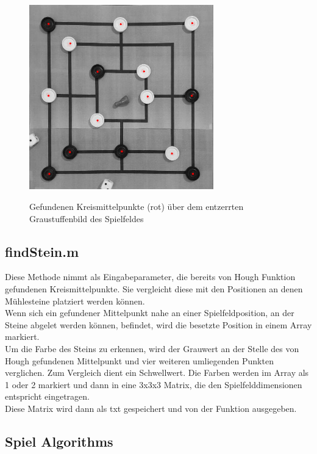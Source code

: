 \documentclass[paper=A4, deutsch]{scrartcl}
\begin{document}
\begin{figure}[ht]
	\centering
		\includegraphics[width=8cm]{hough_performance.jpg}\\
	\caption[Gefundenen Kreismittelpunkte (rot) über dem entzerrten Graustuffenbild des Spielfeldes]{Gefundenen Kreismittelpunkte (rot) über dem entzerrten Graustuffenbild des Spielfeldes}
	\label{fig:hougresult}
\end{figure}


\subsection{findStein.m}
Diese Methode nimmt als Eingabeparameter, die bereits von Hough Funktion gefundenen Kreismittelpunkte. Sie vergleicht diese mit den Positionen an denen Mühlesteine platziert werden können.\\
Wenn sich ein gefundener Mittelpunkt nahe an einer Spielfeldposition, an der Steine abgelet werden können,  befindet,  wird die besetzte Position in einem Array markiert. \\
Um die Farbe des Steins zu erkennen, wird der Grauwert an der Stelle des von Hough gefundenen Mittelpunkt und vier weiteren umliegenden Punkten verglichen. Zum Vergleich dient ein Schwellwert. Die Farben werden  im Array als 1 oder 2 markiert und dann in eine 3x3x3 Matrix, die den Spielfelddimensionen entspricht eingetragen.\\
Diese Matrix wird dann als txt gespeichert und von der Funktion ausgegeben.

\subsection{Spiel Algorithms}


\end{document}
